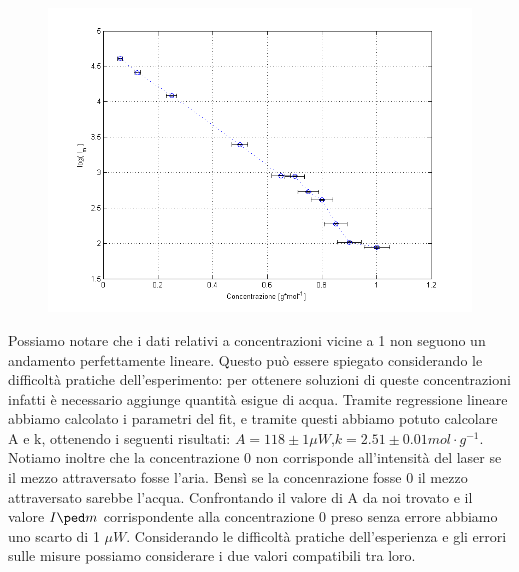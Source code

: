 \documentclass[a4paper,11pt]{article}
\begin{document}
 \begin{center} 
\begin{figure}[htpd]
\hspace{0 pt}
\includegraphics[scale=0.80]{grafico1.png}


\end{figure}
\end{center}
\vspace{7 cm}
Possiamo notare che i dati relativi a concentrazioni vicine a 1 non seguono un andamento perfettamente lineare. Questo può essere spiegato considerando le difficoltà pratiche dell'esperimento: per ottenere soluzioni di queste concentrazioni infatti è necessario aggiunge quantità esigue di acqua. Tramite regressione lineare abbiamo calcolato i parametri del fit, e tramite questi abbiamo potuto calcolare A e k, ottenendo i seguenti risultati: $A = 118  \pm 1 \mu W $,$k = 2.51 \pm 0.01 mol\cdot g^{-1}$. Notiamo inoltre che la concentrazione 0 non corrisponde all'intensità del laser se il mezzo attraversato fosse l'aria. Bensì se la concenrazione fosse 0 il mezzo attraversato sarebbe l'acqua. Confrontando il valore di A da noi trovato e il valore $I\ped m$ corrispondente alla concentrazione 0 preso senza errore abbiamo uno scarto di 1 $\mu W$. Considerando le difficoltà pratiche dell'esperienza e gli errori sulle misure possiamo considerare i due valori compatibili tra loro.   
\end{document}
